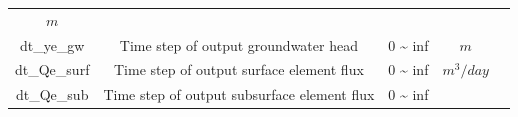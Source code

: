 \documentclass[]{scrbook}
\begin{document}
\begin{longtable}[]{@{}ccccc@{}}
\begin{minipage}[t]{0.10\columnwidth}
\(m\)\strut
\end{minipage} & \begin{minipage}[t]{0.26\columnwidth}\centering\strut
\strut
\end{minipage}\tabularnewline
\begin{minipage}[t]{0.17\columnwidth}\centering\strut
dt\_ye\_gw\strut
\end{minipage} & \begin{minipage}[t]{0.23\columnwidth}\centering\strut
Time step of output groundwater head\strut
\end{minipage} & \begin{minipage}[t]{0.10\columnwidth}\centering\strut
0 \textasciitilde{} inf\strut
\end{minipage} & \begin{minipage}[t]{0.10\columnwidth}\centering\strut
\(m\)\strut
\end{minipage} & \begin{minipage}[t]{0.26\columnwidth}\centering\strut
\strut
\end{minipage}\tabularnewline
\begin{minipage}[t]{0.17\columnwidth}\centering\strut
dt\_Qe\_surf\strut
\end{minipage} & \begin{minipage}[t]{0.23\columnwidth}\centering\strut
Time step of output surface element flux\strut
\end{minipage} & \begin{minipage}[t]{0.10\columnwidth}\centering\strut
0 \textasciitilde{} inf\strut
\end{minipage} & \begin{minipage}[t]{0.10\columnwidth}\centering\strut
\(m^3/day\)\strut
\end{minipage} & \begin{minipage}[t]{0.26\columnwidth}\centering\strut
\strut
\end{minipage}\tabularnewline
\begin{minipage}[t]{0.17\columnwidth}\centering\strut
dt\_Qe\_sub\strut
\end{minipage} & \begin{minipage}[t]{0.23\columnwidth}\centering\strut
Time step of output subsurface element flux\strut
\end{minipage} & \begin{minipage}[t]{0.10\columnwidth}\centering\strut
0 \textasciitilde{} inf\strut
\end{minipage} & \begin{minipage}[t]{0.10\columnwidth}\centering\strut

\end{minipage}
\end{longtable}
\end{document}
